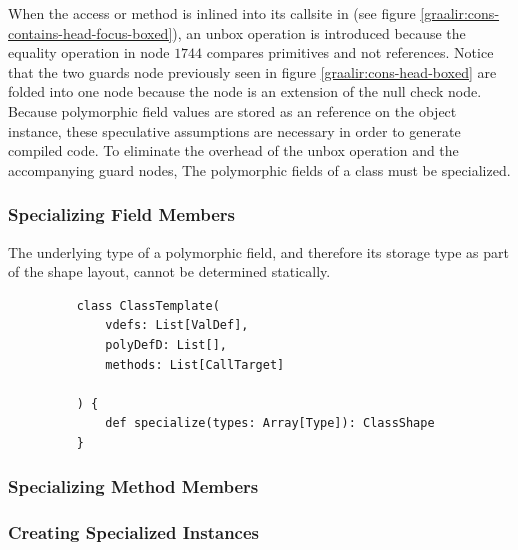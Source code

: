 When the access or method  is inlined into its callsite in  (see figure \ref{graalir:cons-contains-head-focus-boxed}), an unbox operation is introduced because the equality operation in node $1744$ compares primitives and not references.
Notice that the two guards node previously seen in figure \ref{graalir:cons-head-boxed} are folded into one node because the  node is an extension of the null check node.
Because polymorphic field values are stored as an reference on the object instance, these speculative assumptions are necessary in order to generate compiled code.
To eliminate the overhead of the unbox operation and the accompanying guard nodes, The polymorphic fields of a class must be specialized.

\subsubsection*{Specializing Field Members}

The underlying type of a polymorphic field, and therefore its storage type as part of the shape layout, cannot be determined statically.

\begin{figure}[!htb]
	\begin{verbatim}
	class ClassTemplate(
		vdefs: List[ValDef],
		polyDefD: List[],
		methods: List[CallTarget]
	
	) {
		def specialize(types: Array[Type]): ClassShape
	}
	\end{verbatim}
\end{figure}

\subsubsection*{Specializing Method Members}

\subsubsection*{Creating Specialized Instances}

